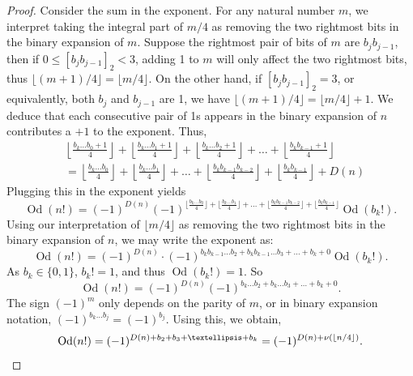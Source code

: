 \documentclass[12pt]{amsart}
\theoremstyle{definition}
\numberwithin{equation}{section}
\DeclareMathOperator{\Od}{Od}
\begin{document}
\begin{proof}
Consider the sum in the exponent. For any natural number $m$, we interpret taking the integral part of $m/4$ as removing the {two} rightmost bits in the binary expansion of $m$. Suppose the rightmost pair of bits of $m$ are $b_jb_{j-1}$, then if $0 \leq [b_j b_{j-1}]_2 < 3$, adding 1 to $m$ will only affect the two rightmost bits, thus $\lfloor (m+1)/4\rfloor = \lfloor m/4\rfloor$. On the other hand, if $[b_jb_{j-1}]_2 = 3$, or equivalently, both $b_j$ and $b_{j-1}$ are 1, we have $\lfloor (m+1)/4\rfloor = \lfloor m/4\rfloor + 1$. We deduce that each consecutive pair of 1s appears in the binary expansion of $n$ contributes a $+1$ to the exponent. Thus,
\begin{align*}
    &\left\lfloor \frac{b_k\ldots b_{0} + 1}{4}\right\rfloor + \left\lfloor \frac{b_k\ldots b_{1} + 1}{4}\right\rfloor + \left\lfloor \frac{b_k\ldots b_{2} + 1}{4}\right\rfloor+  \ldots+  \left\lfloor\frac{b_k b_{k-1} + 1}{4}\right\rfloor\\
    &= \left\lfloor \frac{b_k\ldots b_{0} }{4}\right\rfloor + \left\lfloor \frac{b_k\ldots b_{1}}{4}\right\rfloor +   \ldots+ \left\lfloor \frac{b_kb_{k-1}b_{k-2}}{4}\right\rfloor + \left\lfloor \frac{b_k b_{k-1}}{4}\right\rfloor + D(n)
\end{align*}
 Plugging this in the exponent yields
\[
\Od(n!) = (-1)^{D(n)}(-1)^{\lfloor \frac{b_k\ldots b_{0} }{4}\rfloor + \lfloor \frac{b_k\ldots b_{1}}{4}\rfloor +   \ldots+ \lfloor \frac{b_kb_{k-1}b_{k-2}}{4}\rfloor + \lfloor \frac{b_k b_{k-1}}{4}\rfloor} \Od(b_k!).
\]
Using our interpretation of $\lfloor m/4\rfloor$ as removing the two rightmost bits in the binary expansion of $n$, we may write the exponent as:
\[\Od(n!) = (-1)^{D(n)} \cdot (-1)^{b_kb_{k-1}\ldots b_2 + b_{k}b_{k-1}\ldots b_3 + \ldots + b_{k} + 0} \Od(b_k!).
\]
As $b_k \in \{0,1\}$, $b_k! = 1$, and thus $\Od(b_k!) = 1$. So
\[
\Od(n!) = (-1)^{D(n)}(-1)^{{b_k\ldots b_{2} } +  {b_k\ldots b_{3}} +  \ldots+ b_k + 0}.
\]
The sign $(-1)^m$ only depends on the parity of $m$, or in binary expansion notation, $(-1)^{b_k\ldots b_j} = (-1)^{b_j}$. Using this, we obtain,
\[
\Od(n!) = (-1)^{D(n) + b_2 + b_3 + \ldots + b_k}\\
= (-1)^{D(n) + \nu(\lfloor n/4 \rfloor)}.\qedhere
\]
\end{proof}
\end{document}
